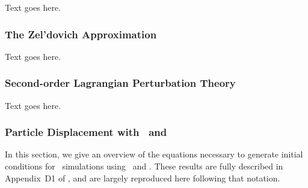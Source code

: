 Text goes here.



\subsubsection{The Zel'dovich Approximation}
\label{subsubsec:computational_theory--perturbation_theory--za}


Text goes here.



\subsubsection{Second-order Lagrangian Perturbation Theory}
\label{subsubsec:computational_theory--perturbation_theory--2lpt}


Text goes here.



\subsubsection{Particle Displacement with \za\ and \lpt}
\label{subsubsec:computational_theory--perturbation_theory--particle_displacement}


In this section, we give an overview of the equations necessary to generate initial conditions for \nbody\ simulations using \za\ and \lpt.  These results are fully described in Appendix~D1 of \citet{1998MNRAS.299.1097S}, and are largely reproduced here following that notation.

